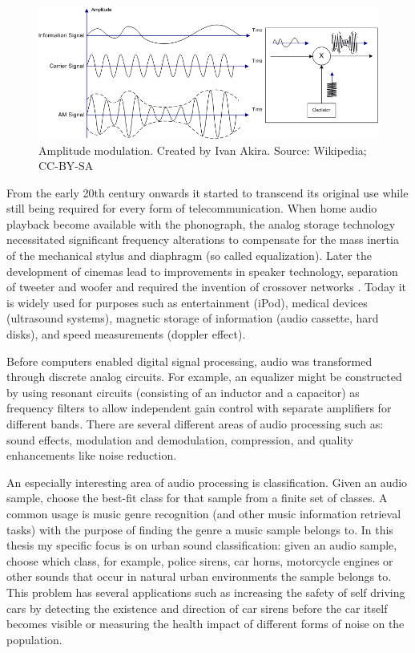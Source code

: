 \begin{figure}[h]
    \centering
	\includegraphics[width=.95\textwidth]{./images/illustrations/am}
    \caption{Amplitude modulation. Created by Ivan Akira. Source: Wikipedia; CC-BY-SA}
    \label{fig:am}
\end{figure}

From the early 20th century onwards it started to transcend its original use while still being required for every form of telecommunication. When home audio playback become available with the phonograph, the analog storage technology necessitated significant frequency alterations to compensate for the mass inertia of the mechanical stylus and diaphragm (so called equalization)\cite{copeland2008manual}. Later the development of cinemas lead to improvements in speaker technology, separation of tweeter and woofer and required the invention of crossover networks \cite{spanias2006audio}.
Today it is widely used for purposes such as entertainment (iPod), medical devices (ultrasound systems), magnetic storage of information (audio cassette, hard disks), and speed measurements  (doppler effect).
 
 
Before computers enabled digital signal processing, audio was transformed through discrete analog circuits. For example, an equalizer might be constructed by using resonant circuits (consisting of an inductor and a capacitor) as frequency filters to allow independent gain control with separate amplifiers for different bands.
There are several different areas of audio processing such as: sound effects, modulation and demodulation, compression, and quality enhancements like noise reduction.

An especially interesting area of audio processing is classification. Given an audio sample, choose the best-fit class for that sample from a finite set of classes.  A common usage is music genre recognition (and other music information retrieval tasks) with the purpose of finding the genre a music sample belongs to. In this thesis my specific focus is on urban sound classification: given an audio sample, choose which class, for example, police sirens, car horns, motorcycle engines or other sounds that occur in natural urban environments the sample belongs to. This problem has several applications such as increasing the safety of self driving cars by detecting the existence and direction of car sirens before the car itself becomes visible or measuring the health impact of different forms of noise on the population.

